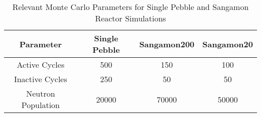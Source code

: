 \begin{table}[h!]
\centering
\caption{Relevant Monte Carlo Parameters for Single Pebble and Sangamon Reactor Simulations}
\begin{tabular}{ c  c  c  c }
\hline
Parameter & Single Pebble & Sangamon200 & Sangamon20 \\
\hline
Active Cycles & 500 & 150 & 100 \\
Inactive Cycles & 250 & 50 & 50  \\
Neutron Population & 20000 & 70000 & 50000 \\
\hline
\end{tabular}

\label{table:run-params}
\end{table}